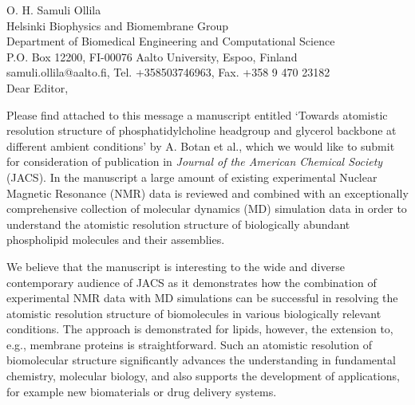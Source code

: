 \documentclass[11pt]{letter}
\begin{document}
\reversemarginpar
\pagestyle{empty}
\noindent O. H. Samuli Ollila \\
\noindent Helsinki Biophysics and Biomembrane Group\\
\noindent Department of Biomedical Engineering and Computational Science\\
\noindent P.O. Box 12200, FI-00076 Aalto University, Espoo, Finland\\
\noindent samuli.ollila@aalto.fi, Tel. +358503746963, Fax. +358 9 470 23182 \\


%
%

Dear Editor,

Please find attached to this message a manuscript entitled `Towards atomistic resolution structure of phosphatidylcholine 
headgroup and glycerol backbone at different ambient conditions' by A. Botan et al., which we would like to submit 
for consideration of publication in \textit{Journal of the American Chemical Society} (JACS). In the manuscript a large amount of
existing experimental Nuclear Magnetic Resonance (NMR) data is reviewed and combined with an exceptionally comprehensive 
collection of molecular dynamics (MD) simulation data in order to understand the atomistic resolution structure 
of biologically abundant phospholipid molecules and their assemblies.

We believe that the manuscript is interesting to the wide and diverse contemporary audience of
JACS as it demonstrates how the combination of experimental NMR data with MD simulations can 
be successful in resolving the atomistic resolution structure of biomolecules in various biologically 
relevant conditions. The approach is demonstrated for lipids, however, the extension to, e.g., membrane 
proteins is straightforward. Such an atomistic resolution of biomolecular structure significantly advances 
the understanding in fundamental chemistry, molecular biology, and also supports the development of applications, 
for example new biomaterials or drug delivery systems. 
\end{document}
